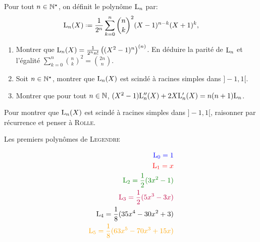 \begin{defi}
    Pour tout $n \in \mathbb{N}^\star$, on définit le polynôme $\mathrm{L}_n$ par:
    $$\Leg_n(X) \defeq \frac{1}{2^n} \sum_{k=0}^{n} \binom{n}{k}^2 (X-1)^{n-k}(X+1)^{k},$$
\end{defi}


\begin{exercice}
    \begin{enumerate}
        \item Montrer que $\mathrm{L}_n(X) = \frac{1}{2^n n!} \left( (X^2-1)^n \right)^{(n)}$. En déduire la parité de $\mathrm{L}_n$ et l'égalité $\sum\limits_{k=0}^n \binom{n}{k}^2 = \binom{2n}{n}$.
        \item Soit $n \in \mathbb{N}^\star$, montrer que $\mathrm{L}_n(X)$ est scindé à racines simples dans $]-1, 1[$. 
        \item Montrer que pour tout $n \in \mathbb{N}$, $(X^2-1) \mathrm{L}''_n(X) + 2X \mathrm{L}'_n(X) = n(n+1) \mathrm{L}_n$.
    \end{enumerate}
\end{exercice}  

\begin{elem_sol}
    Pour montrer que $\mathrm{L}_n(X)$ est scindé à racines simples dans $]-1, 1[$, raisonner par récurrence et penser à \textsc{Rolle}. 
\end{elem_sol}

\begin{marginfigure}[-11.5cm]
    \centering
	
	\caption*{\centering Les premiers polynômes de \textsc{Legendre}}
	\small
	\begin{align*}
	    \color{blue} \Leg_0 = 1 \\
	    \color{red} \Leg_1 = x \\
	    \color{green} \Leg_2 = \frac{1}{2}(3x^2-1) \\
	    \color{purple} \Leg_3 = \frac{1}{2}(5x^3-3x) \\
	    \color{black} \Leg_4 = \frac{1}{8}(35x^4-30x^2+3) \\
	    \color{orange} \Leg_5 = \frac{1}{8}(63x^5-70x^3+15x)
	\end{align*}
\end{marginfigure}

